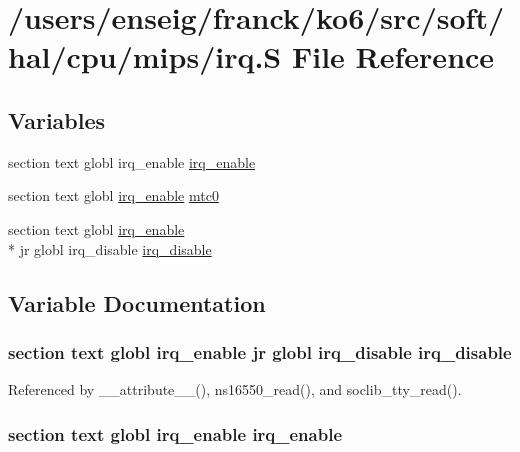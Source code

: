 \hypertarget{mips_2irq_8S}{\section{/users/enseig/franck/ko6/src/soft/hal/cpu/mips/irq.S File Reference}
\label{mips_2irq_8S}
}
\subsection*{Variables}
\begin{DoxyCompactItemize}
\item 
section text globl irq\-\_\-enable \hyperlink{mips_2irq_8S_aaef40102bb274fecd542c306bb6a8e20}{irq\-\_\-enable}
\item 
section text globl \hyperlink{cpu_2irq_8h_a0a004f8aa16635895a42e0667f26c420}{irq\-\_\-enable} \hyperlink{mips_2irq_8S_ac1d8c155e12dea1db68be9995a69b3da}{mtc0}
\item 
section text globl \hyperlink{cpu_2irq_8h_a0a004f8aa16635895a42e0667f26c420}{irq\-\_\-enable} \\*
jr globl irq\-\_\-disable \hyperlink{mips_2irq_8S_ab061b784fed23b72808250b4cd9276a3}{irq\-\_\-disable}
\end{DoxyCompactItemize}


\subsection{Variable Documentation}
\hypertarget{mips_2irq_8S_ab061b784fed23b72808250b4cd9276a3}{
\subsubsection[{irq\-\_\-disable}]{\setlength{\rightskip}{0pt plus 5cm}section text globl {\bf irq\-\_\-enable} jr globl irq\-\_\-disable irq\-\_\-disable}}\label{mips_2irq_8S_ab061b784fed23b72808250b4cd9276a3}


Referenced by \-\_\-\-\_\-attribute\-\_\-\-\_\-(), ns16550\-\_\-read(), and soclib\-\_\-tty\-\_\-read().

\hypertarget{mips_2irq_8S_aaef40102bb274fecd542c306bb6a8e20}{
\subsubsection[{irq\-\_\-enable}]{\setlength{\rightskip}{0pt plus 5cm}section text globl irq\-\_\-enable irq\-\_\-enable}}\label{mips_2irq_8S_aaef40102bb274fecd542c306bb6a8e20}



